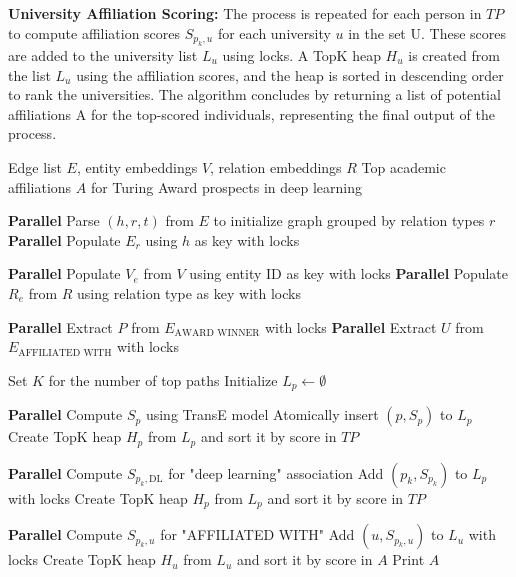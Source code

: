 \documentclass[sigconf]{acmart}
\begin{document}
{\bf{University Affiliation Scoring:}} The process is repeated for each person in $TP$ to compute affiliation scores $S_{p_k, u}$ for each university $u$ in the set U. These scores are added to the university list $L_u$ using locks. A TopK heap $H_u$ is created from the list $L_u$ using the affiliation scores, and the heap is sorted in descending order to rank the universities. The algorithm concludes by returning a list of potential affiliations A for the top-scored individuals, representing the final output of the process.



\begin{algorithm*}
\caption{Parallel Multi-Hop Reasoning for Academic Affiliation Discovery}
\begin{algorithmic}[1]

\Require Edge list $E$, entity embeddings $V$, relation embeddings $R$
\Ensure Top academic affiliations $A$ for Turing Award prospects in deep learning

\State \textbf{Parallel} Parse $(h, r, t)$ from $E$ to initialize graph grouped by relation types $r$ 
\State \textbf{Parallel} Populate $E_r$ using $h$ as key with locks 

\State \textbf{Parallel} Populate $V_e$ from $V$ using entity ID as key with locks 
\State \textbf{Parallel} Populate $R_e$ from $R$ using relation type as key with locks 

\State \textbf{Parallel} Extract $P$ from $E_{\text{AWARD WINNER}}$ with locks 
\State \textbf{Parallel} Extract $U$ from $E_{\text{AFFILIATED WITH}}$ with locks 

\State Set $K$ for the number of top paths 
\State Initialize $L_p \gets \emptyset$ 

\State \textbf{Parallel} 
    \State Compute $S_p$ using TransE model
    \State Atomically insert $(p, S_p)$ to $L_p$
\EndFor
\State Create TopK heap $H_p$ from $L_p$ and sort it by score in $TP$


\State \textbf{Parallel} 
    \State Compute $S_{p_k, \text{DL}}$ for "deep learning" association
    \State Add $(p_k, S_{p_k})$ to $L_p$ with locks
\EndFor
\State Create TopK heap $H_p$ from $L_p$ and sort it by score in $TP$


   \State \textbf{Parallel} 
        \State Compute $S_{p_k, u}$ for "AFFILIATED WITH"
        \State Add $(u, S_{p_k, u})$ to $L_u$ with locks
    \EndFor
    \State Create TopK heap $H_u$ from $L_u$ and sort it by score in $A$
    \State Print $A$ 
\EndFor

\end{algorithmic}
\label{algo:naive}
\end{algorithm*}
\end{document}
